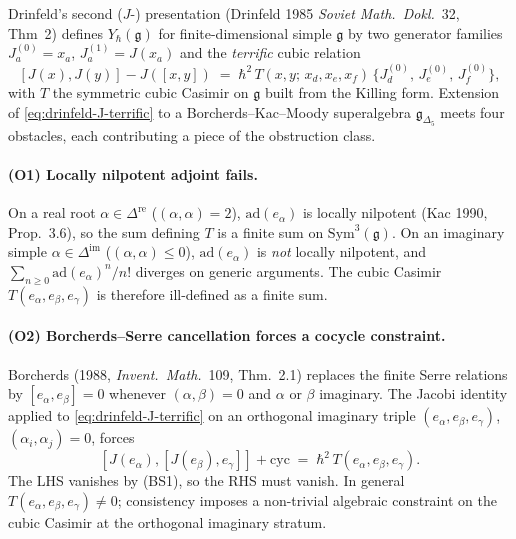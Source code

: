 Drinfeld's second ($J$-) presentation (Drinfeld 1985 \emph{Soviet Math.\ Dokl.}~32,
Thm~2) defines $Y_\hbar(\mathfrak g)$ for finite-dimensional simple $\mathfrak g$ by
two generator families $J^{(0)}_a = x_a$, $J^{(1)}_a = J(x_a)$ and the
\emph{terrific} cubic relation
\begin{equation}
\label{eq:drinfeld-J-terrific}
[J(x),J(y)] - J([x,y])
\;=\; \hbar^2\,T(x,y;\, x_d,x_e,x_f)\,\{J^{(0)}_d,\,J^{(0)}_e,\,J^{(0)}_f\},
\end{equation}
with $T$ the symmetric cubic Casimir on $\mathfrak g$ built from the Killing form.
Extension of \eqref{eq:drinfeld-J-terrific} to a Borcherds--Kac--Moody
superalgebra $\mathfrak g_{\Delta_5}$ meets four obstacles, each contributing
a piece of the obstruction class.

\paragraph{(O1) Locally nilpotent adjoint fails.}
On a real root $\alpha\in\Delta^{\mathrm{re}}$ ($(\alpha,\alpha)=2$), $\mathrm{ad}(e_\alpha)$
is locally nilpotent (Kac 1990, Prop.~3.6), so the sum defining $T$ is a
finite sum on $\mathrm{Sym}^3(\mathfrak g)$. On an imaginary simple
$\alpha\in\Delta^{\mathrm{im}}$ ($(\alpha,\alpha)\le 0$), $\mathrm{ad}(e_\alpha)$
is \emph{not} locally nilpotent, and $\sum_{n\ge 0}\mathrm{ad}(e_\alpha)^n/n!$ diverges
on generic arguments. The cubic Casimir $T(e_\alpha,e_\beta,e_\gamma)$ is
therefore ill-defined as a finite sum.

\paragraph{(O2) Borcherds--Serre cancellation forces a cocycle constraint.}
Borcherds (1988, \emph{Invent.\ Math.}~109, Thm.~2.1) replaces the finite
Serre relations by $[e_\alpha,e_\beta]=0$ whenever $(\alpha,\beta)=0$ and
$\alpha$ or $\beta$ imaginary. The Jacobi identity applied to
\eqref{eq:drinfeld-J-terrific} on an orthogonal imaginary triple
$(e_\alpha,e_\beta,e_\gamma)$, $(\alpha_i,\alpha_j)=0$, forces
\[
 [J(e_\alpha),[J(e_\beta),e_\gamma]]+\mathrm{cyc}
 \;=\; \hbar^2\,T(e_\alpha,e_\beta,e_\gamma).
\]
The LHS vanishes by (BS1), so the RHS must vanish. In general
$T(e_\alpha,e_\beta,e_\gamma)\ne 0$; consistency imposes a non-trivial
algebraic constraint on the cubic Casimir at the orthogonal imaginary stratum.

